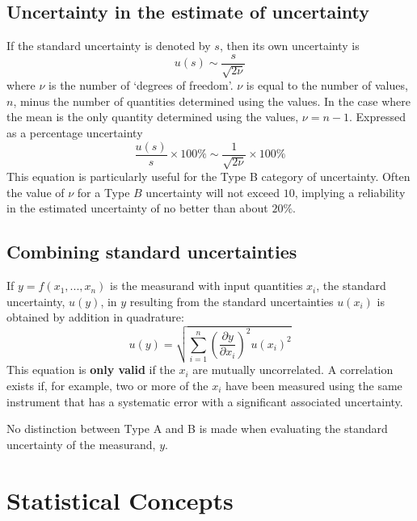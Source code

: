 \subsection{Uncertainty in the estimate of uncertainty}

If the standard uncertainty is denoted by $s$, then its own uncertainty is
\begin{equation}
    u(s) \sim \frac{s}{\sqrt{2\nu}}
\end{equation}
where $\nu$ is the number of `degrees of freedom'. $\nu$ is equal to the number of values, $n$, minus the number of quantities determined using the values. In the case where the mean is the only quantity determined using the values, $\nu = n-1$. Expressed as a percentage uncertainty
\begin{equation}
    \frac{u(s)}{s}\times 100\%\sim \frac{1}{\sqrt{2\nu}}\times 100\%
\end{equation}
This equation is particularly useful for the Type B category of uncertainty. Often the value of $\nu$ for a Type $B$ uncertainty will not exceed $10$, implying a reliability in the estimated uncertainty of no better than about $20\%$. 


\subsection{Combining standard uncertainties}

If $y  = f(x_1,...,x_n)$ is the measurand with input quantities $x_i$, the standard uncertainty, $u(y)$, in $y$ resulting from the standard uncertainties $u(x_i)$ is obtained by addition in quadrature:
\begin{equation}
    u(y) = \sqrt{\sum_{i=1}^n\left(\frac{\partial y}{\partial x_i}\right)^2u(x_i)^2}
\end{equation}
This equation is \textbf{only valid} if the $x_i$ are mutually uncorrelated. A correlation exists if, for example, two or more of the $x_i$ have been measured using the same instrument that has a systematic error with a significant associated uncertainty.


No distinction between Type A and B is made when evaluating the standard uncertainty of the measurand, $y$.




\section{Statistical Concepts}


